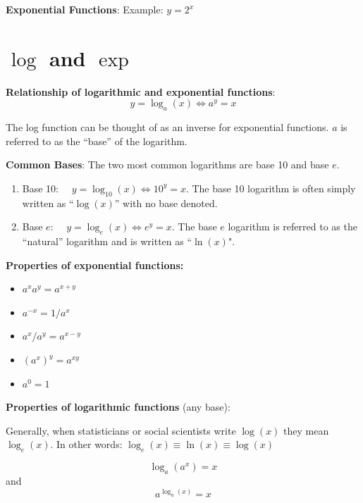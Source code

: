 \documentclass[]{book}
\providecommand{\tightlist}{%
  \setlength{\itemsep}{0pt}\setlength{\parskip}{0pt}}
\theoremstyle{definition}
\theoremstyle{definition}
\theoremstyle{definition}
\theoremstyle{remark}
\begin{document}
\textbf{Exponential Functions}: Example: \(y=2^x\)

\hypertarget{logexponents}{%
\section{\texorpdfstring{\(\log\) and \(\exp\)}{\textbackslash{}log and \textbackslash{}exp}}\label{logexponents}}

\textbf{Relationship of logarithmic and exponential functions}:
\[y=\log_a(x) \iff a^y=x\]

The log function can be thought of as an inverse for exponential functions. \(a\) is referred to as the ``base'' of the logarithm.

\textbf{Common Bases}: The two most common logarithms are base 10 and base \(e\).

\begin{enumerate}
\def\labelenumi{\arabic{enumi}.}
\tightlist
\item
  Base 10: \(\quad y=\log_{10}(x) \iff 10^y=x\). The base 10 logarithm is often simply written as ``\(\log(x)\)'' with no base denoted.
\item
  Base \(e\): \(\quad y=\log_e(x) \iff e^y=x\). The base \(e\) logarithm is referred to as the ``natural'' logarithm and is written as ``\(\ln(x)\)".
\end{enumerate}

\textbf{Properties of exponential functions:}

\begin{itemize}
\tightlist
\item
  \(a^x a^y = a^{x+y}\)
\item
  \(a^{-x} = 1/a^x\)
\item
  \(a^x/a^y = a^{x-y}\)
\item
  \((a^x)^y = a^{x y}\)
\item
  \(a^0 = 1\)
\end{itemize}

\textbf{Properties of logarithmic functions} (any base):

Generally, when statisticians or social scientists write \(\log(x)\) they mean \(\log_e(x)\). In other words: \(\log_e(x) \equiv \ln(x) \equiv \log(x)\)

\[\log_a(a^x)=x\] and
\[a^{\log_a(x)}=x\]
\end{document}
